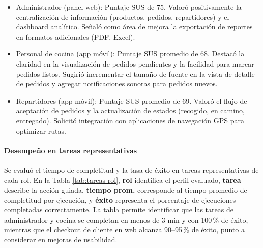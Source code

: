 \begin{itemize}
  \item Administrador (panel web): Puntaje SUS de 75. Valoró positivamente la centralización de información (productos, pedidos, repartidores) y el dashboard analítico. Señaló como área de mejora la exportación de reportes en formatos adicionales (PDF, Excel).
  \item Personal de cocina (app móvil): Puntaje SUS promedio de 68. Destacó la claridad en la visualización de pedidos pendientes y la facilidad para marcar pedidos listos. Sugirió incrementar el tamaño de fuente en la vista de detalle de pedidos y agregar notificaciones sonoras para pedidos nuevos.
  \item Repartidores (app móvil): Puntaje SUS promedio de 69. Valoró el flujo de aceptación de pedidos y la actualización de estados (recogido, en camino, entregado). Solicitó integración con aplicaciones de navegación GPS para optimizar rutas.
\end{itemize}

\paragraph{Desempeño en tareas representativas}

Se evaluó el tiempo de completitud y la tasa de éxito en tareas representativas de cada rol. En la Tabla \ref{tab:tareas-rol}, \textbf{rol} identifica el perfil evaluado, \textbf{tarea} describe la acción guiada, \textbf{tiempo prom.} corresponde al tiempo promedio de completitud por ejecución, y \textbf{éxito} representa el porcentaje de ejecuciones completadas correctamente. La tabla permite identificar que las tareas de administrador y cocina se completan en menos de 3 min y con 100\,\% de éxito, mientras que el checkout de cliente en web alcanza 90--95\,\% de éxito, punto a considerar en mejoras de usabilidad.

